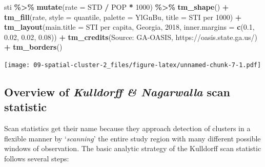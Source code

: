 \documentclass[
]{book}
\newenvironment{Shaded}{\begin{snugshade}}{\end{snugshade}}
\newcommand{\AttributeTok}[1]{\textcolor[rgb]{0.13,0.29,0.53}{#1}}
\newcommand{\DecValTok}[1]{\textcolor[rgb]{0.00,0.00,0.81}{#1}}
\newcommand{\FloatTok}[1]{\textcolor[rgb]{0.00,0.00,0.81}{#1}}
\newcommand{\FunctionTok}[1]{\textcolor[rgb]{0.13,0.29,0.53}{\textbf{#1}}}
\newcommand{\NormalTok}[1]{#1}
\newcommand{\SpecialCharTok}[1]{\textcolor[rgb]{0.81,0.36,0.00}{\textbf{#1}}}
\newcommand{\StringTok}[1]{\textcolor[rgb]{0.31,0.60,0.02}{#1}}
\begin{document}
\begin{Shaded}
\begin{Highlighting}[]
\NormalTok{sti }\SpecialCharTok{\%\textgreater{}\%}
  \FunctionTok{mutate}\NormalTok{(}\AttributeTok{rate =}\NormalTok{ STD }\SpecialCharTok{/}\NormalTok{ POP }\SpecialCharTok{*} \DecValTok{1000}\NormalTok{) }\SpecialCharTok{\%\textgreater{}\%}
  \FunctionTok{tm\_shape}\NormalTok{() }\SpecialCharTok{+} 
  \FunctionTok{tm\_fill}\NormalTok{(}\StringTok{\textquotesingle{}rate\textquotesingle{}}\NormalTok{,}
          \AttributeTok{style =} \StringTok{\textquotesingle{}quantile\textquotesingle{}}\NormalTok{,}
          \AttributeTok{palette =} \StringTok{\textquotesingle{}YlGnBu\textquotesingle{}}\NormalTok{,}
          \AttributeTok{title =} \StringTok{\textquotesingle{}STI per 1000\textquotesingle{}}\NormalTok{) }\SpecialCharTok{+}
  \FunctionTok{tm\_layout}\NormalTok{(}\AttributeTok{main.title =} \StringTok{\textquotesingle{}STI per capita, Georgia, 2018\textquotesingle{}}\NormalTok{,}
            \AttributeTok{inner.margins =} \FunctionTok{c}\NormalTok{(}\FloatTok{0.1}\NormalTok{, }\FloatTok{0.02}\NormalTok{, }\FloatTok{0.02}\NormalTok{, }\FloatTok{0.08}\NormalTok{)) }\SpecialCharTok{+}
  \FunctionTok{tm\_credits}\NormalTok{(}\StringTok{\textquotesingle{}Source: GA{-}OASIS, https://oasis.state.ga.us/\textquotesingle{}}\NormalTok{) }\SpecialCharTok{+}
  \FunctionTok{tm\_borders}\NormalTok{()}
\end{Highlighting}
\end{Shaded}

\texttt{[image: 09-spatial-cluster-2\_files/figure-latex/unnamed-chunk-7-1.pdf]}

\hypertarget{overview-of-kulldorff-nagarwalla-scan-statistic}{%
\subsection{\texorpdfstring{Overview of \emph{Kulldorff \& Nagarwalla} scan statistic}{Overview of Kulldorff \& Nagarwalla scan statistic}}\label{overview-of-kulldorff-nagarwalla-scan-statistic}}

Scan statistics get their name because they approach detection of clusters in a flexible manner by `\emph{scanning}' the entire study region with many different possible windows of observation. The basic analytic strategy of the Kulldorff scan statistic follows several steps:
\end{document}
